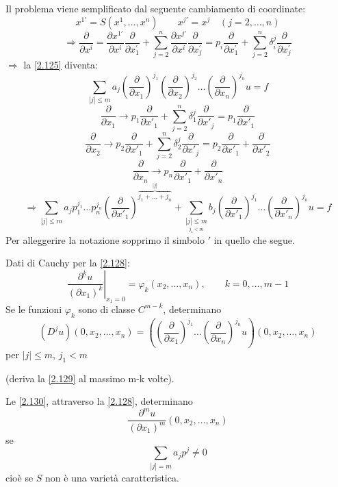 \documentclass[a4paper,11pt]{report}
\begin{document}
Il problema viene semplificato dal seguente cambiamento di coordinate:
\[
x^{1\prime}=S(x^1,\dots, x^n) \qquad x^{j\prime}=x^j \quad (j=2,\dots,n)
\]
\[
\Rightarrow \frac{\partial}{\partial x^i} = \frac{\partial x^{1\prime}}{\partial x^i}\frac{\partial}{\partial x^{\prime}_1}+\sum_{j=2}^n \frac{\partial x^{j\prime}}{\partial x^i}\frac{\partial}{\partial x^{\prime}_j}=p_i\frac{\partial}{\partial x^{\prime}_1} + \sum_{j=2}^n \delta_i^j \frac{\partial}{\partial x^{\prime}_j}
\]
$\Rightarrow$ la \eqref{2.125} diventa:
\[
\sum_{|j| \leq m} a_j\left(\frac{\partial}{\partial x_1}\right)^{j_1}\left(\frac{\partial}{\partial x_2}\right)^{j_2} \dots \left(\frac{\partial}{\partial x_n}\right)^{j_n}u=f
\]
\[
\frac{\partial}{\partial x_1} \rightarrow p_1\frac{\partial}{\partial x'_1} + \sum_{j=2}^n \delta^j_1 \frac{\partial}{\partial x'_j} = p_1\frac{\partial}{\partial x'_1}
\]
\[
\frac{\partial}{\partial x_2} \rightarrow p_2\frac{\partial}{\partial x'_1} + \sum_{j=2}^n \delta^j_2 \frac{\partial}{\partial x'_j} = p_2\frac{\partial}{\partial x'_1} + \frac{\partial}{\partial x'_2}
\]
\[
\frac{\partial}{\partial x_n} \rightarrow p_n \frac{\partial}{\partial x'_1} + \frac{\partial}{\partial x'_n}
\]
\begin{equation}
\Rightarrow \sum_{|j|\leq m} a_j p_1^{j_1}\ldots p_n^{j_n}\left(\frac{\partial}{\partial x'_1}\right)^{\overbrace{\scriptstyle j_1 + \ldots  + j_n}^{|j|}} + \sum_{\underset{j_1<m}{|j|\leq m}}b_j\left(\frac{\partial}{\partial x'_1}\right)^{j_1} \ldots \left(\frac{\partial}{\partial x'_n}\right)^{j_n}u=f
\label{2.128}
\end{equation}
Per alleggerire la notazione sopprimo il simbolo $'$ in quello che segue.

Dati di Cauchy per la \eqref{2.128}:
\begin{equation}
\left.\frac{\partial^k u}{(\partial x_1)^k}\right|_{x_1=0}=\varphi_k(x_2,\dots, x_n) , \qquad k=0,\dots,m-1
\label{2.129}
\end{equation}
Se le funzioni $\varphi_k$ sono di classe $C^{m-k}$, determinano 
\begin{equation}
(D^j u)(0,x_2,\dots,x_n)=\left(\left(\frac{\partial}{\partial x_1}\right)^{j_1}\dots \left(\frac{\partial}{\partial x_n}\right)^{j_n}u\right)(0,x_2,\dots,x_n)
\label{2.130}
\end{equation}
per $|j|\leq m$, $j_1<m$ 

(deriva la \eqref{2.129} al massimo m-k volte).

Le \eqref{2.130}, attraverso la \eqref{2.128}, determinano
\[
\frac{\partial^m u}{(\partial x_1)^m} (0,x_2,\dots, x_n)
\]
se
\[
\sum_{|j|=m} a_j p^j \neq 0
\]
cio\`e se $S$ non \`e una variet\`a caratteristica. 
\end{document}
